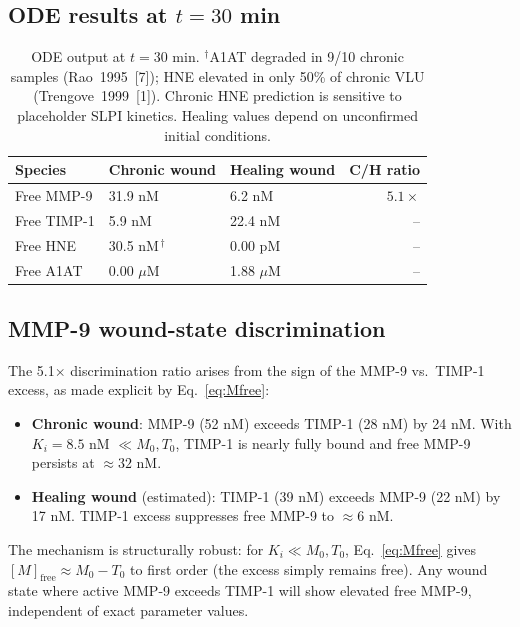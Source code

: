 \documentclass[10pt,a4paper]{article}
\numberwithin{equation}{section}
\newcommand{\cit}[1]{[#1]}   %
\begin{document}
\subsection{ODE results at $t = 30$ min}

\begin{table}[H]
\centering
\small\renewcommand{\arraystretch}{1.3}
\begin{tabular}{@{}lllr@{}}
\toprule
\textbf{Species} & \textbf{Chronic wound} & \textbf{Healing wound} & \textbf{C/H ratio} \\
\midrule
Free MMP-9   & 31.9 nM & 6.2 nM  & $5.1\times$ \\
Free TIMP-1  & 5.9 nM  & 22.4 nM & -- \\
Free HNE     & 30.5 nM$^{\,\dagger}$ & 0.00 pM & -- \\
Free A1AT    & 0.00 $\mu$M & 1.88 $\mu$M & -- \\
\bottomrule
\end{tabular}
\caption{ODE output at $t = 30$ min. ${}^{\dagger}$A1AT degraded in 9/10 chronic
samples (Rao~1995~\cit{7}); HNE elevated in only 50\% of chronic VLU
(Trengove~1999~\cit{1}). Chronic HNE prediction is sensitive to placeholder SLPI
kinetics. Healing values depend on unconfirmed initial conditions.}
\label{tab:outputs}
\end{table}

\subsection{MMP-9 wound-state discrimination}

The 5.1$\times$ discrimination ratio arises from the sign of the MMP-9 vs.\ TIMP-1
excess, as made explicit by Eq.~\eqref{eq:Mfree}:

\begin{itemize}[noitemsep]
  \item \textbf{Chronic wound}: MMP-9 (52 nM) exceeds TIMP-1 (28 nM) by 24 nM.
    With $K_i = 8.5$ nM $\ll M_0, T_0$, TIMP-1 is nearly fully bound and free
    MMP-9 persists at $\approx 32$ nM.
  \item \textbf{Healing wound} (estimated): TIMP-1 (39 nM) exceeds MMP-9 (22 nM)
    by 17 nM. TIMP-1 excess suppresses free MMP-9 to $\approx 6$ nM.
\end{itemize}

The mechanism is structurally robust: for $K_i \ll M_0, T_0$,
Eq.~\eqref{eq:Mfree} gives $[M]_{\text{free}} \approx M_0 - T_0$ to first order
(the excess simply remains free). Any wound state where active MMP-9 exceeds TIMP-1
will show elevated free MMP-9, independent of exact parameter values.
\end{document}
